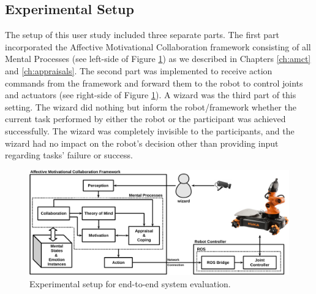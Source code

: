 \documentclass[12pt]{report}
\begin{document}
% 
% 
% 
% 
\subsection{Experimental Setup}
The setup of this user study included three separate parts. The first
part incorporated the Affective Motivational Collaboration framework consisting
of all Mental Processes (see left-side of Figure \ref{fig:framework}) as we
described in Chapters \ref{ch:amct} and \ref{ch:appraisals}. The second part was
implemented to receive action commands from the framework and forward them to
the robot to control joints and actuators (see right-side of Figure
\ref{fig:framework}). A wizard was the third part of this setting. The wizard
did nothing but inform the robot/framework whether the current task performed by
either the robot or the participant was achieved successfully. The wizard was
completely invisible to the participants, and the wizard had no impact on the
robot's decision other than providing input regarding tasks' failure or success.

\begin{figure}[tbh]
  \centering
  \includegraphics[width=\textwidth]{figure/framework-croped.pdf}
  \caption{Experimental setup for end-to-end system evaluation.}
  \label{fig:framework}
\end{figure}
\end{document}
